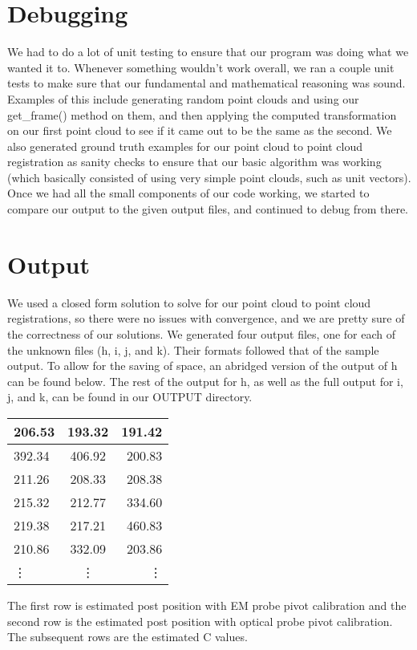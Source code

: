 \documentclass[a4paper]{article}
\begin{document}
\section{Debugging}
We had to do a lot of unit testing to ensure that our program was doing what we wanted it to. Whenever something wouldn't work overall, we ran a couple unit tests to make sure that our fundamental and mathematical reasoning was sound. Examples of this include generating random point clouds and using our get\_frame() method on them, and then applying the computed transformation on our first point cloud to see if it came out to be the same as the second.\break
We also generated ground truth examples for our point cloud to point cloud registration as sanity checks to ensure that our basic algorithm was working (which basically consisted of using very simple point clouds, such as unit vectors). Once we had all the small components of our code working, we started to compare our output to the given output files, and continued to debug from there.

\section{Output}
We used a closed form solution to solve for our point cloud to point cloud registrations, so there were no issues with convergence, and we are pretty sure of the correctness of our solutions.
\break
We generated four output files, one for each of the unknown files (h, i, j, and k). Their formats followed that of the sample output. To allow for the saving of space, an abridged version of the output of h can be found below. The rest of the output for h, as well as the full output for i, j, and k, can be found in our OUTPUT directory.
\begin{center}
\begin{tabular}{| l | c | r |}
\hline
206.53 & 193.32 & 191.42 \\
\hline
392.34 & 406.92 & 200.83 \\
\hline
211.26 & 208.33 & 208.38 \\
215.32 & 212.77 & 334.60 \\
219.38 & 217.21 & 460.83 \\
210.86 & 332.09 & 203.86 \\
\vdots & \vdots & \vdots \\
\hline
\end{tabular}
\end{center}
\break
The first row is estimated post position with EM probe pivot calibration and the second row is the estimated post position with
optical probe pivot calibration. The subsequent rows are the estimated C values.
\end{document}
